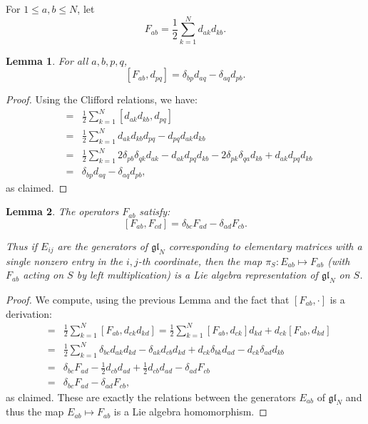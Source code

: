 \documentclass[11pt]{article}
\newtheorem{lemma}{Lemma}
\newcommand{\myd}{d}
\begin{document}
For \(1\le a,b\le N\), let
\[
        F_{ab}=\frac12\sum_{k=1}^N\myd_{ak}\myd_{kb}.
\]

\begin{lemma} \label{lem:FgivesAdjointAction}
For all \(a,b,p,q\),
\[
        [F_{ab},\myd_{pq}]
        =
        \delta_{bp}\myd_{aq}-\delta_{aq}\myd_{pb}.
\]
\end{lemma}

\begin{proof}
Using the Clifford relations, we have:
\begin{eqnarray*}
    [F_{ab},\myd_{pq}] &=& \frac{1}{2}\sum_{k=1}^N 
    [\myd_{ak}\myd_{kb},\myd_{pq}] \\
    &=& \frac{1}{2}\sum_{k=1}^N \myd_{ak} \myd_{kb}\myd_{pq} -  \myd_{pq} \myd_{ak}\myd_{kb} \\
    &=& \frac{1}{2}\sum_{k=1}^N   2\delta_{pb}\delta_{qk}\myd_{ak}  - \myd_{ak} \myd_{pq} \myd_{kb} - 2\delta_{pk}\delta_{qa}\myd_{kb} + \myd_{ak} \myd_{pq}\myd_{kb} \\
    &=& \delta_{bp}\myd_{aq} - \delta_{aq}\myd_{pb},
\end{eqnarray*} as claimed.
\end{proof}


\begin{lemma} \label{lem:FareGLN}
The operators \(F_{ab}\) satisfy:
\[
        [F_{ab},F_{cd}]
        =
        \delta_{bc}F_{ad}-\delta_{ad}F_{cb}.
\]

Thus if $E_{ij}$ are the generators of \(\mathfrak{gl}_N\) corresponding to elementary matrices with a single nonzero entry in the $i,j$-th coordinate, then the map  $\pi_S: E_{ab}\mapsto F_{ab}$ (with $F_{ab}$  acting on $S$ by left multiplication) is a Lie algebra representation of  \(\mathfrak{gl}_N\) on $S$.
\end{lemma}
\begin{proof}
We compute, using the previous Lemma and the fact that $[F_{ab},\cdot]$ is a derivation:
\begin{eqnarray*}
     [F_{ab},F_{cd}] &=&  \frac12\sum_{k=1}^N [F_{ab},\myd_{ck}\myd_{kd}] 
        = \frac12\sum_{k=1}^N [F_{ab},\myd_{ck}]\myd_{kd} +
            \myd_{ck}[F_{ab},\myd_{kd}] \\
        &=&  \frac12\sum_{k=1}^N \delta_{bc}\myd_{ak}\myd_{kd} - \delta_{ak}\myd_{cb}\myd_{kd} + \myd_{ck} \delta_{bk} \myd_{ad} 
            -\myd_{ck}\delta_{ad} \myd_{kb} \\
        &=& \delta_{bc} F_{ad} - \frac12 \myd_{cb}\myd_{ad} + \frac12 \myd_{cb}\myd_{ad} - \delta_{ad}F_{cb} \\
        &=& \delta_{bc} F_{ad}  - \delta_{ad}F_{cb},
\end{eqnarray*} as claimed.  These are exactly the relations between the generators $E_{ab}$ of $\mathfrak{gl}_N$ and thus the map $E_{ab}\mapsto F_{ab}$ is a Lie algebra homomorphism. 
\end{proof}
\end{document}
